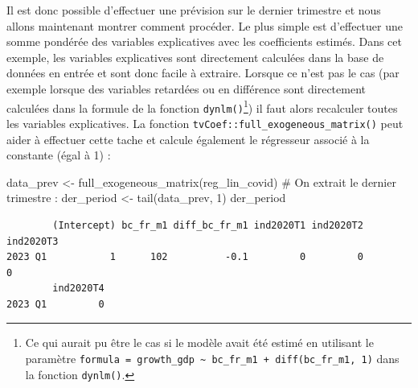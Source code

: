 \documentclass[
  a4paper,
  DIV=11,
  numbers=noendperiod,
  french]{scrartcl}
\newenvironment{Shaded}{\begin{snugshade}}{\end{snugshade}}
\newcommand{\CommentTok}[1]{\textcolor[rgb]{0.37,0.37,0.37}{#1}}
\newcommand{\DecValTok}[1]{\textcolor[rgb]{0.68,0.00,0.00}{#1}}
\newcommand{\FunctionTok}[1]{\textcolor[rgb]{0.28,0.35,0.67}{#1}}
\newcommand{\NormalTok}[1]{\textcolor[rgb]{0.00,0.23,0.31}{#1}}
\newcommand{\OtherTok}[1]{\textcolor[rgb]{0.00,0.23,0.31}{#1}}
\newcommand\1{{\mathds 1}}
\theoremstyle{remark}
\begin{document}
Il est donc possible d'effectuer une prévision sur le dernier trimestre
et nous allons maintenant montrer comment procéder. Le plus simple est
d'effectuer une somme pondérée des variables explicatives avec les
coefficients estimés. Dans cet exemple, les variables explicatives sont
directement calculées dans la base de données en entrée et sont donc
facile à extraire. Lorsque ce n'est pas le cas (par exemple lorsque des
variables retardées ou en différence sont directement calculées dans la
formule de la fonction \texttt{dynlm()}\footnote{ Ce qui aurait pu être
  le cas si le modèle avait été estimé en utilisant le paramètre
  \texttt{formula\ =\ growth\_gdp\ \textasciitilde{}\ bc\_fr\_m1\ +\ diff(bc\_fr\_m1,\ 1)}
  dans la fonction \texttt{dynlm()}.}) il faut alors recalculer toutes
les variables explicatives. La fonction
\texttt{tvCoef::full\_exogeneous\_matrix()} peut aider à effectuer cette
tache et calcule également le régresseur associé à la constante (égal à
1) :

\begin{Shaded}
\begin{Highlighting}[]
\NormalTok{data\_prev }\OtherTok{\textless{}{-}} \FunctionTok{full\_exogeneous\_matrix}\NormalTok{(reg\_lin\_covid)}
\CommentTok{\# On extrait le dernier trimestre :}
\NormalTok{der\_period }\OtherTok{\textless{}{-}} \FunctionTok{tail}\NormalTok{(data\_prev, }\DecValTok{1}\NormalTok{)}
\NormalTok{der\_period}
\end{Highlighting}
\end{Shaded}

\begin{verbatim}
        (Intercept) bc_fr_m1 diff_bc_fr_m1 ind2020T1 ind2020T2 ind2020T3
2023 Q1           1      102          -0.1         0         0         0
        ind2020T4
2023 Q1         0
\end{verbatim}
\end{document}
